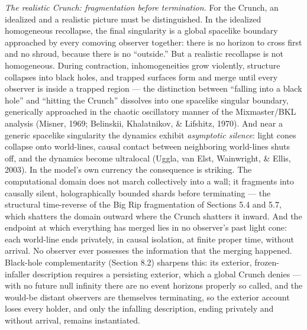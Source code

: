 \documentclass[
]{article}
\begin{document}
\emph{The realistic Crunch: fragmentation before termination.} For the
Crunch, an idealized and a realistic picture must be distinguished. In
the idealized homogeneous recollapse, the final singularity is a global
spacelike boundary approached by every comoving observer together: there
is no horizon to cross first and no shroud, because there is no
``outside.'' But a realistic recollapse is not homogeneous. During
contraction, inhomogeneities grow violently, structure collapses into
black holes, and trapped surfaces form and merge until every observer is
inside a trapped region --- the distinction between ``falling into a
black hole'' and ``hitting the Crunch'' dissolves into one spacelike
singular boundary, generically approached in the chaotic oscillatory
manner of the Mixmaster/BKL analysis (Misner, 1969; Belinskii,
Khalatnikov, \& Lifshitz, 1970). And near a generic spacelike
singularity the dynamics exhibit \emph{asymptotic silence}: light cones
collapse onto world-lines, causal contact between neighboring
world-lines shuts off, and the dynamics become ultralocal (Uggla, van
Elst, Wainwright, \& Ellis, 2003). In the model's own currency the
consequence is striking. The computational domain does not march
collectively into a wall; it fragments into causally silent,
holographically bounded shards before terminating --- the structural
time-reverse of the Big Rip fragmentation of Sections 5.4 and 5.7, which
shatters the domain outward where the Crunch shatters it inward. And the
endpoint at which everything has merged lies in no observer's past light
cone: each world-line ends privately, in causal isolation, at finite
proper time, without arrival. No observer ever possesses the information
that the merging happened. Black-hole complementarity (Section 8.2)
sharpens this: its exterior, frozen-infaller description requires a
persisting exterior, which a global Crunch denies --- with no future
null infinity there are no event horizons properly so called, and the
would-be distant observers are themselves terminating, so the exterior
account loses every holder, and only the infalling description, ending
privately and without arrival, remains instantiated.
\end{document}
